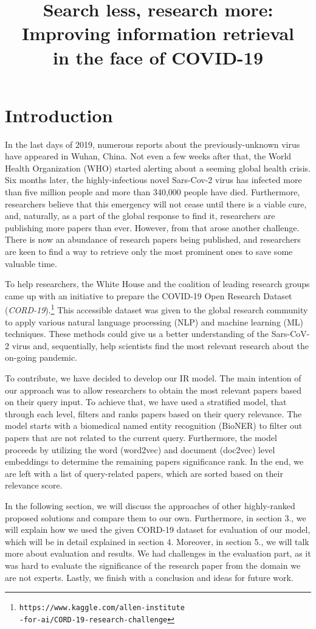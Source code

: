 \documentclass[10pt, a4paper]{article}
\title{
	Search less, research more: Improving information retrieval\\
	in the face of COVID-19\\
}
\begin{document}
	
	\maketitleabstract
	
	\section{Introduction}
	
	In the last days of 2019, numerous reports about the previously-unknown virus have appeared in Wuhan, China. Not even a few weeks after that, the World Health Organization (WHO) started alerting about a seeming global health crisis. Six months later, the highly-infectious novel Sars-Cov-2 virus has infected more than five million people and more than 340,000 people have died. Furthermore, researchers believe that this emergency will not cease until there is a viable cure, and, naturally, as a part of the global response to find it, researchers are publishing more papers than ever. However, from that arose another challenge. There is now an abundance of research papers being published, and researchers are keen to find a way to retrieve only the most prominent ones to save some valuable time.
	
	To help researchers, the White House and the coalition of leading research groups came up with an initiative to prepare the COVID-19 Open Research Dataset (\emph{CORD-19}).\footnote{\texttt{https://www.kaggle.com/allen-institute\\-for-ai/CORD-19-research-challenge}} This accessible dataset was given to the global research community to apply various natural language processing (NLP) and machine learning (ML) techniques. These methods could give us a better understanding of the Sars-CoV-2 virus and, sequentially, help scientists find the most relevant research about the on-going pandemic.
	
	To contribute, we have decided to develop our IR model. The main intention of our approach was to allow researchers to obtain the most relevant papers based on their query input. To achieve that, we have used a stratified model, that through each level, filters and ranks papers based on their query relevance.  The model starts with a biomedical named entity recognition (BioNER) to filter out papers that are not related to the current query. Furthermore, the model proceeds by utilizing the word (word2vec) and document (doc2vec) level embeddings to determine the remaining papers significance rank. In the end, we are left with a list of query-related papers, which are sorted based on their relevance score.
	
	In the following section, we will discuss the approaches of other highly-ranked proposed solutions and compare them to our own. Furthermore, in section 3., we will explain how we used the given CORD-19 dataset for evaluation of our model, which will be in detail explained in section 4. Moreover, in section 5., we will talk more about evaluation and results.  We had challenges in the evaluation part, as it was hard to evaluate the significance of the research paper from the domain we are not experts. Lastly, we finish with a conclusion and ideas for future work.
	
\end{document}
